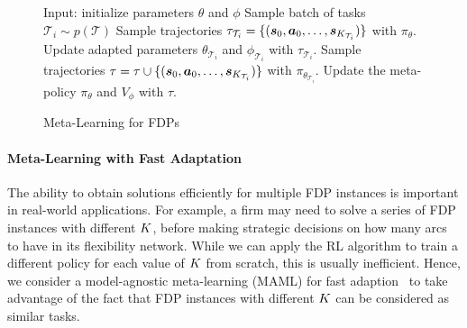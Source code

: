 \documentclass{article} %
\newcommand{\lei}[1]{{\color{red}{\bf\sf [Lei: #1]}}}
\begin{document}
\begin{wrapfigure}{R}{0.58\textwidth}
	\begin{minipage}{0.58\textwidth}
		\vspace{-6mm}
\begin{algorithm}[H]
    \caption{Meta-Learning for FDPs}
    \label{alg1}
\begin{algorithmic}[1]
    \STATE Input: initialize parameters $\theta$ and $\phi$
    \STATE Sample batch of tasks $\mathcal{T}_i \sim p(\mathcal{T})$
    \STATE Sample trajectories $\tau_{\mathcal{T}_i}=\{({\boldsymbol s}_0, {\boldsymbol a}_0, \ldots, {\boldsymbol s}_{K_{\mathcal{T}_i}})\}$ with $\pi_\theta$.
    \STATE Update adapted parameters $\theta_{\mathcal{T}_i}$ and $\phi_{\mathcal{T}_i}$ with $\tau_{\mathcal{T}_i}$.
    \STATE Sample trajectories $\tau=\tau \cup \{({\boldsymbol s}_0, {\boldsymbol a}_0, \ldots, {\boldsymbol s}_{K_{\mathcal{T}_i}})\}$ with $\pi_{\theta_{\mathcal{T}_i}}$. %
    \ENDFOR
    \STATE Update the meta-policy $\pi_\theta$ and $V_\phi$ with $\tau$.
    \ENDWHILE
\end{algorithmic}
\end{algorithm}
	\end{minipage}
	\vspace{-2mm}
\end{wrapfigure}

\vspace{-2mm}
\paragraph{Meta-Learning with Fast Adaptation}

The ability to obtain solutions efficiently for multiple FDP instances is important in real-world applications. For example, a firm may need to solve a series of FDP instances with different $K$, before making strategic decisions on how many arcs to have in its flexibility network. While we can apply the RL algorithm to train a different policy for each value of $K$ from scratch, this is usually inefficient. Hence, we consider a model-agnostic meta-learning (MAML) for fast adaption~\citep{finn2017model} to take advantage of the fact that FDP instances with different $K$ can be considered as similar tasks. 
\end{document}
